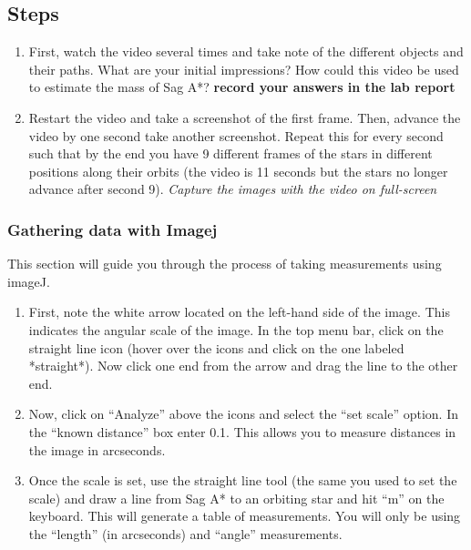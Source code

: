 \subsection{Steps}
\begin{enumerate}
	\item First, watch the video several times and take note of the different objects and their paths. What are your initial impressions? How could this video be used to estimate the mass of Sag A*? \textbf{record your answers in the lab report}
	
	\item  Restart the video and take a screenshot of the first frame. Then, advance the video by one second take another screenshot. Repeat this for every second such that by the end you have 9 different frames of the stars in different positions along their orbits (the video is 11 seconds but the stars no longer advance after second 9). \textit{Capture the images with the video on full-screen} 
\end{enumerate}
	
\subsubsection{Gathering data with Imagej}
This section will guide you through the process of taking measurements using imageJ.
\begin{enumerate}
	\item First, note the white arrow located on the left-hand side of the image. This indicates the angular scale of the image. In the top menu bar, click on the straight line icon (hover over the icons and click on the one labeled *straight*). Now click one end from the arrow and drag the line to the other end.
	
	\item Now, click on ``Analyze'' above the icons and select the ``set scale'' option. In the ``known distance'' box enter 0.1. This allows you to measure distances in the image in arcseconds. 
	
	\item Once the scale is set, use the straight line tool (the same you used to set the scale) and draw a line from Sag A* to an orbiting star and hit ``m'' on the keyboard. This will generate a table of measurements. You will only be using the ``length'' (in arcseconds) and ``angle'' measurements. 
\end{enumerate}

